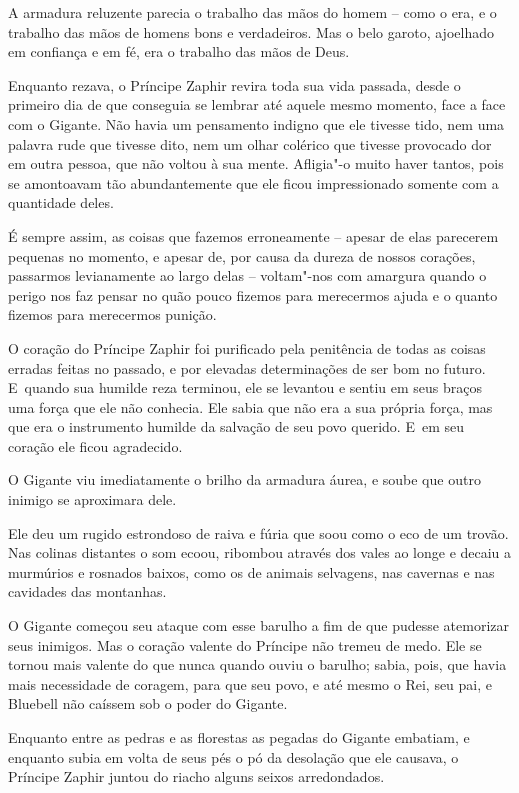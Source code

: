 A armadura reluzente parecia o trabalho das mãos do homem -- como o era,
e o trabalho das mãos de homens bons e verdadeiros. Mas o belo garoto,
ajoelhado em confiança e em fé, era o trabalho das mãos de Deus.

Enquanto rezava, o Príncipe Zaphir revira toda sua vida passada, desde o
primeiro dia de que conseguia se lembrar até aquele mesmo momento, face
a face com o Gigante. Não havia um pensamento indigno que ele tivesse
tido, nem uma palavra rude que tivesse dito, nem um olhar colérico que
tivesse provocado dor em outra pessoa, que não voltou à sua mente.
Afligia"-o muito haver tantos, pois se amontoavam tão abundantemente que
ele ficou impressionado somente com a quantidade deles.

É sempre assim, as coisas que fazemos erroneamente -- apesar de elas
parecerem pequenas no momento, e apesar de, por causa da dureza de
nossos corações, passarmos levianamente ao largo delas -- voltam"-nos com
amargura quando o perigo nos faz pensar no quão pouco fizemos para
merecermos ajuda e o quanto fizemos para merecermos punição.

O coração do Príncipe Zaphir foi purificado pela penitência de todas as
coisas erradas feitas no passado, e por elevadas determinações de ser
bom no futuro. E~quando sua humilde reza terminou, ele se levantou e
sentiu em seus braços uma força que ele não conhecia. Ele sabia que não
era a sua própria força, mas que era o instrumento humilde da salvação
de seu povo querido. E~em seu coração ele ficou agradecido.

O Gigante viu imediatamente o brilho da armadura áurea, e soube que
outro inimigo se aproximara dele.

Ele deu um rugido estrondoso de raiva e fúria que soou como o eco de um
trovão. Nas colinas distantes o som ecoou, ribombou através dos vales ao
longe e decaiu a murmúrios e rosnados baixos, como os de animais
selvagens, nas cavernas e nas cavidades das montanhas.

O Gigante começou seu ataque com esse barulho a fim de que pudesse
atemorizar seus inimigos. Mas o coração valente do Príncipe não tremeu
de medo. Ele se tornou mais valente do que nunca quando ouviu o barulho;
sabia, pois, que havia mais necessidade de coragem, para que seu povo, e
até mesmo o Rei, seu pai, e Bluebell não caíssem sob o poder do Gigante.

Enquanto entre as pedras e as florestas as pegadas do Gigante embatiam,
e enquanto subia em volta de seus pés o pó da desolação que ele causava,
o Príncipe Zaphir juntou do riacho alguns seixos arredondados.

